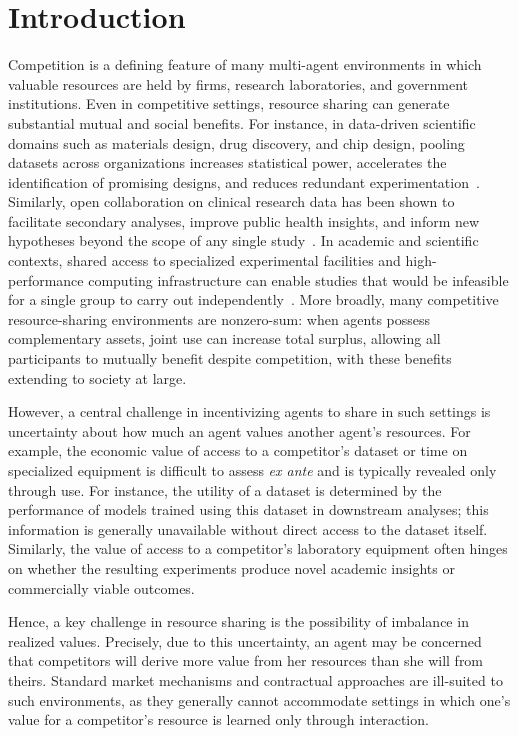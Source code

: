 
\section{Introduction}
\label{sec:intro}

Competition is a defining feature of many multi-agent environments in which valuable resources are held by firms, research laboratories, and government institutions. Even in competitive settings, resource sharing can generate substantial mutual and social benefits. For instance, in data-driven scientific domains such as materials design, drug discovery, and chip design, pooling datasets across organizations increases statistical power, accelerates the identification of promising designs, and reduces redundant experimentation~\cite{DataReuseOpenDataAdvantage, Villanueva2021,resonac_joint3_2025}. Similarly, open collaboration on clinical research data has been shown to facilitate secondary analyses, improve public health insights, and inform new hypotheses beyond the scope of any single study~\cite{NCBI_SharingClinicalData, NatGeneticsDataSharing}. In academic and scientific contexts, shared access to specialized experimental facilities and high-performance computing infrastructure can enable studies that would be infeasible for a single group to carry out independently~\citep{ambulos2025greater,cuboulder_greenlabs_2024,orduna2014sharing}. More broadly, many competitive resource-sharing environments are nonzero-sum: when agents possess complementary assets, joint use can increase total surplus, allowing all participants to mutually benefit despite competition, with these benefits extending to society at large.

However, a central challenge in incentivizing agents to share in such settings is uncertainty about how much an agent values another agent’s resources. For example, the economic value of access to a competitor’s dataset or time on specialized equipment is difficult to assess \emph{ex ante} and is typically revealed only through use.
For instance, the utility of a dataset is determined by the performance of models trained using this dataset in downstream analyses; this information is generally unavailable without direct access to the dataset itself. Similarly, the value of access to a competitor’s laboratory equipment often hinges on whether the resulting experiments produce novel academic insights or commercially viable outcomes.

Hence, a key challenge in resource sharing is the possibility of imbalance in realized values. Precisely, due to this uncertainty, an agent may be concerned that competitors will derive more value from her resources than she will from theirs. Standard market mechanisms and contractual approaches are ill-suited to such environments, as they generally cannot accommodate settings in which one's value for a competitor's resource is learned only through interaction.



